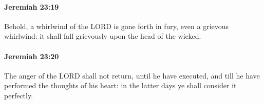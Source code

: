 		\paragraph{Jeremiah 23:19} %
			\label{JEREMIAH-23-19}

			Behold, a whirlwind of the LORD is gone forth in fury, even a grievous whirlwind: it shall fall grievously upon the head of the wicked.


		\paragraph{Jeremiah 23:20} %
			\label{JEREMIAH-23-20}

			The anger of the LORD shall not return, until he have executed, and till he have performed the thoughts of his heart: in the latter days ye shall consider it perfectly.


